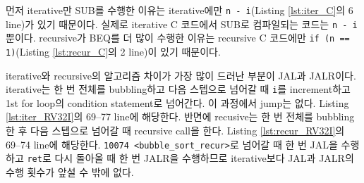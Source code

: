 \documentclass[
    a4paper,
    oneside,
    adjustmath,
    finemath,
    itemph,
    nonfrench,
    11pt
]{oblivoir}
\begin{document}
\begin{enumerate}
        먼저 iterative만 SUB를 수행한 이유는 iterative에만 \verb|n - i|(Listing \ref{lst:iter_C}의 6 line)가 있기 때문이다.
        실제로 iterative C 코드에서 SUB로 컴파일되는 코드는 \verb|n - i| 뿐이다.
        recursive가 BEQ를 더 많이 수행한 이유는 recursive C 코드에만 \verb|if (n == 1)|(Listing \ref{lst:recur_C}의 2 line)이 있기 때문이다.

        iterative와 recursive의 알고리즘 차이가 가장 많이 드러난 부분이 JAL과 JALR이다.
        iterative는 한 번 전체를 bubbling하고 다음 스텝으로 넘어갈 때 \verb|i|를 increment하고 1st for loop의 condition statement로 넘어간다.
        이 과정에서 jump는 없다.
        Listing \ref{lst:iter_RV32I}의 \numrange{69}{77} line에 해당한다.
        반면에 recusive는 한 번 전체를 bubbling한 후 다음 스텝으로 넘어갈 때 recursive call을 한다.
        Listing \ref{lst:recur_RV32I}의 \numrange{69}{74} line에 해당한다.
        \verb|10074 <bubble_sort_recur>|로 넘어갈 때 한 번 JAL을 수행하고 \verb|ret|로 다시 돌아올 때 한 번 JALR을 수행하므로 iterative보다 JAL과 JALR의 수행 횟수가 앞설 수 밖에 없다.
    \end{enumerate}
\end{document}
